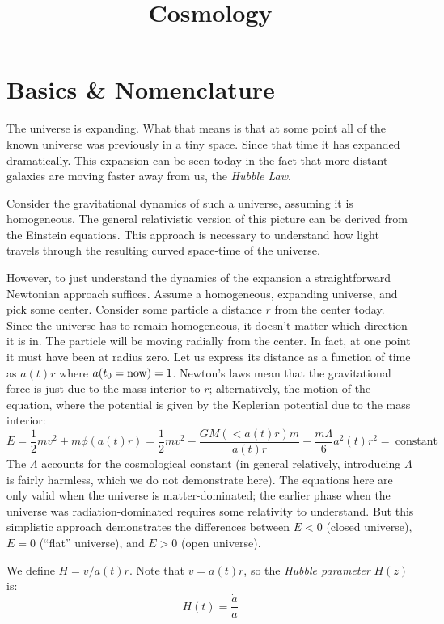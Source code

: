 \title{\bf Cosmology}

\section{Basics \& Nomenclature}

The universe is expanding. What that means is that at some point all
of the known universe was previously in a tiny space. Since that time
it has expanded dramatically. This expansion can be seen today in the
fact that more distant galaxies are moving faster away from us, the
{\it Hubble Law}.

Consider the gravitational dynamics of such a universe, assuming it is
homogeneous. The general relativistic version of this picture can be
derived from the Einstein equations. This approach is necessary to
understand how light travels through the resulting curved space-time
of the universe.

However, to just understand the dynamics of the expansion a
straightforward Newtonian approach suffices.  Assume a homogeneous,
expanding universe, and pick some center.  Consider some particle a
distance $r$ from the center today. Since the universe has to remain
homogeneous, it doesn't matter which direction it is in.  The particle
will be moving radially from the center. In fact, at one point it must
have been at radius zero. Let us express its distance as a function of
time as $a(t)r$ where $a(t_0 = {\rm now}) = 1$. Newton's laws mean
that the gravitational force is just due to the mass interior to $r$;
alternatively, the motion of the %
equation, where the potential is given by the Keplerian potential due
to the mass interior:
\begin{equation}
E = \frac{1}{2} m v^2 + m \phi(a(t) r) = \frac{1}{2} m v^2 -
\frac{GM(<a(t) r)m}{a(t) r} - \frac{m\Lambda}{6} a^2(t) r^2 =
\mathrm{~constant}
\end{equation}
The $\Lambda$ accounts for the cosmological constant (in general
relatively, introducing $\Lambda$ is fairly harmless, which we do not
demonstrate here). The equations here are only valid when the universe
is matter-dominated; the earlier phase when the universe was
radiation-dominated requires some relativity to understand. But this
simplistic approach demonstrates the differences between $E<0$ (closed
universe), $E=0$ (``flat'' universe), and $E>0$ (open universe).

We define $H=v/a(t)r$. Note that $v={\dot a}(t) r$, so the {\it Hubble
  parameter} $H(z)$ is:
\begin{equation}
  H(t) = \frac{\dot a}{a}
\end{equation}

